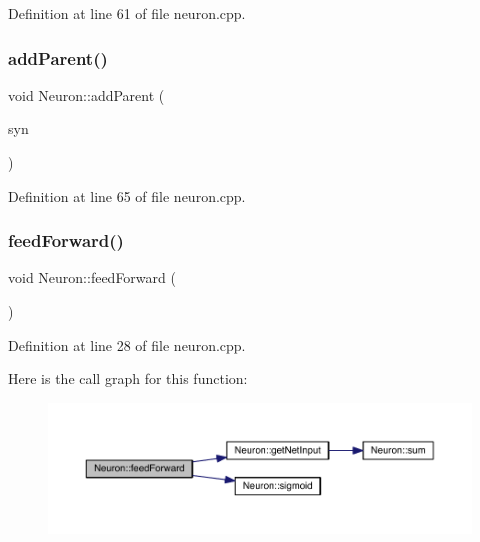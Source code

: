 Definition at line 61 of file neuron.\+cpp.

\mbox{\label{class_neuron_aee0e35aff21d424300a314fb0695da2e}} 
\subsubsection{\texorpdfstring{add\+Parent()}{addParent()}}
{\footnotesize\ttfamily void Neuron\+::add\+Parent (\begin{DoxyParamCaption}\item[{\hyperlink{neural_network_8h_ac587b5c69519c070958c5cb318ddc50f}{Synapse\+Ptr}}]{syn }\end{DoxyParamCaption})}



Definition at line 65 of file neuron.\+cpp.

\mbox{\label{class_neuron_a65a5533d21bd589a51a9ad502dfcb331}} 
\subsubsection{\texorpdfstring{feed\+Forward()}{feedForward()}}
{\footnotesize\ttfamily void Neuron\+::feed\+Forward (\begin{DoxyParamCaption}{ }\end{DoxyParamCaption})}



Definition at line 28 of file neuron.\+cpp.

Here is the call graph for this function\+:\nopagebreak
\begin{figure}[H]
\begin{center}
\leavevmode
\includegraphics[width=350pt]{class_neuron_a65a5533d21bd589a51a9ad502dfcb331_cgraph}
\end{center}
\end{figure}
\mbox{\label{class_neuron_a09bc798d5f673efd080092001ac3916c}} 

